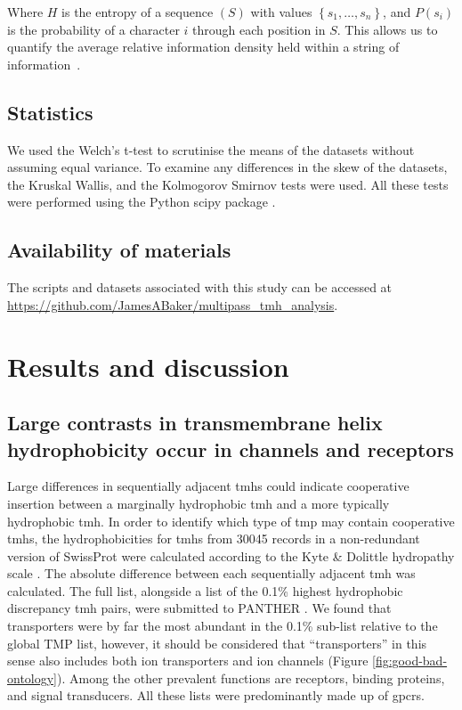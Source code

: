 Where $H$ is the entropy of a sequence $(S)$ with values $ \left\{ {s}_{1},\ldots, {s}_{n} \right\} $, and $P \left( s_i \right)$ is the probability of a character $i$ through each position in $S$.
This allows us to quantify the average relative information density held within a string of information~\cite{Shannon1948}.

\subsection{Statistics}

We used the Welch's t\--test to scrutinise the means of the datasets without assuming equal variance.
To examine any differences in the skew of the datasets, the Kruskal Wallis, and the Kolmogorov Smirnov tests were used.
All these tests were performed using the Python scipy package \cite{Oliphant2007}.

\subsection{Availability of materials}

The scripts and datasets associated with this study can be accessed at \url{https://github.com/JamesABaker/multipass_tmh_analysis}.


\section{Results and discussion}

\subsection{Large contrasts in transmembrane helix hydrophobicity occur in channels and receptors}
Large differences in sequentially adjacent \gls{tmh}s could indicate cooperative insertion between a marginally hydrophobic \gls{tmh} and a more typically hydrophobic \gls{tmh}.
In order to identify which type of \gls{tmp} may contain cooperative \gls{tmh}s, the hydrophobicities for \gls{tmh}s from 30045 records in a non-redundant version of SwissProt were calculated according to the Kyte \& Dolittle hydropathy scale \cite{Kyte1982}.
The absolute difference between each sequentially adjacent \gls{tmh} was calculated.
The full list, alongside a list of the 0.1\% highest hydrophobic discrepancy \gls{tmh} pairs, were submitted to PANTHER \cite{Mi2017}.
We found that transporters were by far the most abundant in the 0.1\% sub\--list relative to the global TMP list, however, it should be considered that ``transporters'' in this sense also includes both ion transporters and ion channels (Figure \ref{fig:good-bad-ontology}).
Among the other prevalent functions are receptors, binding proteins, and signal transducers.
All these lists were predominantly made up of \gls{gpcr}s.


